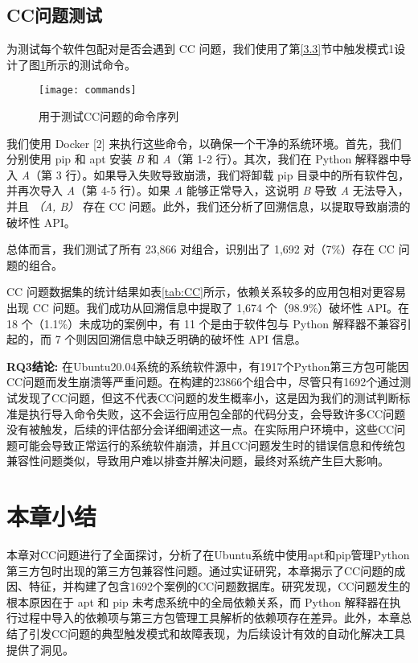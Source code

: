 \subsection{CC问题测试}
为测试每个软件包配对是否会遇到 CC 问题，我们使用了第\ref{3.3}节中触发模式1设计了图\ref{fig:command}所示的测试命令。
\begin{figure}[htbp] %
	\centering
	\texttt{[image: commands]}
	\caption{用于测试CC问题的命令序列}
	\label{fig:command}
\end{figure}
我们使用 Docker [2] 来执行这些命令，以确保一个干净的系统环境。首先，我们分别使用 pip 和 apt 安装 \textit{B} 和 \textit{A}（第 1-2 行）。其次，我们在 Python 解释器中导入 \textit{A}（第 3 行）。如果导入失败导致崩溃，我们将卸载 pip 目录中的所有软件包，并再次导入 \textit{A}（第 4-5 行）。如果 \textit{A} 能够正常导入，这说明 \textit{B} 导致 \textit{A} 无法导入，并且 \textit{（A, B）} 存在 CC 问题。此外，我们还分析了回溯信息，以提取导致崩溃的破坏性 API。

总体而言，我们测试了所有 23,866 对组合，识别出了 1,692 对（7\%）存在 CC 问题的组合。

CC 问题数据集的统计结果如表\ref{tab:CC}所示，依赖关系较多的应用包相对更容易出现 CC 问题。我们成功从回溯信息中提取了 1,674 个（98.9\%）破坏性 API。在 18 个（1.1\%）未成功的案例中，有 11 个是由于软件包与 Python 解释器不兼容引起的，而 7 个则因回溯信息中缺乏明确的破坏性 API 信息。

\begin{tcolorbox}[boxrule=1pt,boxsep=1pt,left=2pt,right=2pt,top=2pt,bottom=2pt]
	\small
	\textcolor{red}{} \noindent\textbf{RQ3结论:} 
	在Ubuntu20.04系统的系统软件源中，有1917个Python第三方包可能因CC问题而发生崩溃等严重问题。在构建的23866个组合中，尽管只有1692个通过测试发现了CC问题，但这不代表CC问题的发生概率小，这是因为我们的测试判断标准是执行导入命令失败，这不会运行应用包全部的代码分支，会导致许多CC问题没有被触发，后续的评估部分会详细阐述这一点。在实际用户环境中，这些CC问题可能会导致正常运行的系统软件崩溃，并且CC问题发生时的错误信息和传统包兼容性问题类似，导致用户难以排查并解决问题，最终对系统产生巨大影响。
\end{tcolorbox} 

\section{本章小结}
本章对CC问题进行了全面探讨，分析了在Ubuntu系统中使用apt和pip管理Python第三方包时出现的第三方包兼容性问题。通过实证研究，本章揭示了CC问题的成因、特征，并构建了包含1692个案例的CC问题数据库。研究发现，CC问题发生的根本原因在于 apt 和 pip 未考虑系统中的全局依赖关系，而 Python 解释器在执行过程中导入的依赖项与第三方包管理工具解析的依赖项存在差异。此外，本章总结了引发CC问题的典型触发模式和故障表现，为后续设计有效的自动化解决工具提供了洞见。